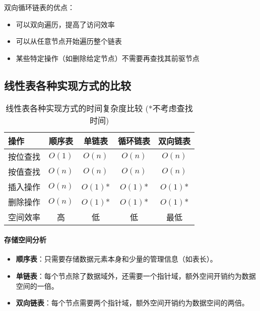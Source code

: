 \documentclass{../../note}
\begin{document}
双向循环链表的优点：
\begin{itemize}
  \item 可以双向遍历，提高了访问效率
  \item 可以从任意节点开始遍历整个链表
  \item 某些特定操作（如删除给定节点）不需要再查找其前驱节点
\end{itemize}

\subsection{线性表各种实现方式的比较}

\begin{table}[h]
  \centering
  \begin{tabular}{|l|c|c|c|c|}
    \hline
    \textbf{操作} & \textbf{顺序表} & \textbf{单链表} & \textbf{循环链表} & \textbf{双向链表} \\
    \hline
    按位查找 & $O(1)$ & $O(n)$ & $O(n)$ & $O(n)$ \\
    按值查找 & $O(n)$ & $O(n)$ & $O(n)$ & $O(n)$ \\
    插入操作 & $O(n)$ & $O(1)$* & $O(1)$* & $O(1)$* \\
    删除操作 & $O(n)$ & $O(1)$* & $O(1)$* & $O(1)$* \\
    空间效率 & 高 & 低 & 低 & 最低 \\
    \hline
  \end{tabular}
  \caption{线性表各种实现方式的时间复杂度比较 (*不考虑查找时间)}
\end{table}

\paragraph{存储空间分析}
\begin{itemize}
  \item \textbf{顺序表}：只需要存储数据元素本身和少量的管理信息（如表长）。
  \item \textbf{单链表}：每个节点除了数据域外，还需要一个指针域，额外空间开销约为数据空间的一倍。
  \item \textbf{双向链表}：每个节点需要两个指针域，额外空间开销约为数据空间的两倍。
\end{itemize}
\end{document}
